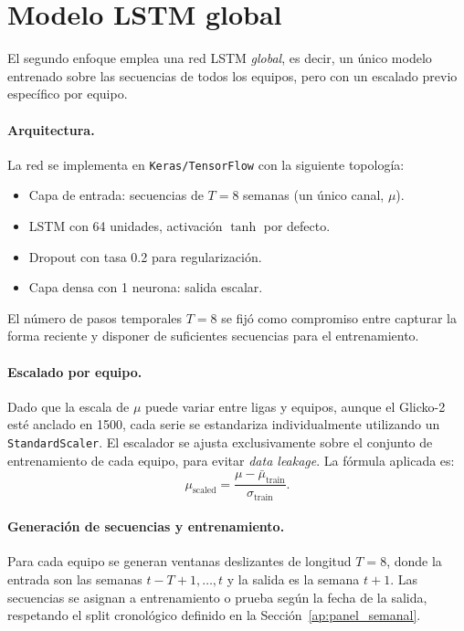 \section{Modelo LSTM global}
\label{ap:lstm_global}

El segundo enfoque emplea una red LSTM \textit{global}, es decir, un \'unico modelo entrenado sobre las secuencias de todos los equipos, pero con un escalado previo espec\'ifico por equipo.

\paragraph{Arquitectura.}
La red se implementa en \texttt{Keras/TensorFlow} con la siguiente topolog\'ia:
\begin{itemize}
	\item Capa de entrada: secuencias de \(T = 8\) semanas (un \'unico canal, \(\mu\)).
	\item LSTM con 64 unidades, activaci\'on $\tanh$ por defecto.
	\item Dropout con tasa 0.2 para regularizaci\'on.
	\item Capa densa con 1 neurona: salida escalar.
\end{itemize}
El n\'umero de pasos temporales \(T = 8\) se fij\'o como compromiso entre capturar la forma reciente y disponer de suficientes secuencias para el entrenamiento.

\paragraph{Escalado por equipo.}
Dado que la escala de \(\mu\) puede variar entre ligas y equipos, aunque el Glicko-2 est\'e anclado en 1500, cada serie se estandariza individualmente utilizando un \texttt{StandardScaler}. El escalador se ajusta exclusivamente sobre el conjunto de entrenamiento de cada equipo, para evitar \textit{data leakage}. La f\'ormula aplicada es:
\[
\mu_{\text{scaled}} = \frac{\mu - \bar{\mu}_{\text{train}}}{\sigma_{\text{train}}}.
\]

\paragraph{Generaci\'on de secuencias y entrenamiento.}
Para cada equipo se generan ventanas deslizantes de longitud \(T=8\), donde la entrada son las semanas \(t-T+1, \dots, t\) y la salida es la semana \(t+1\). Las secuencias se asignan a entrenamiento o prueba seg\'un la fecha de la salida, respetando el split cronol\'ogico definido en la Secci\'on~\ref{ap:panel_semanal}.

